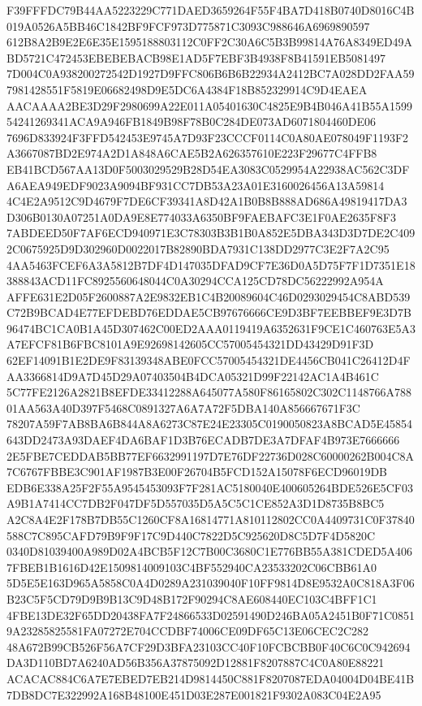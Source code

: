 \documentclass[UTF8,fontset=fandol,zihao=-4,a4paper]{ctexart}
\begin{document}
{{F39FFFDC79B44AA5223229C771DAED3659264F55F4BA7D418B0740D8016C4B019A0526A5BB46C1842BF9FCF973D775871C3093C988646A6969890597
612B8A2B9E2E6E35E1595188803112C0FF2C30A6C5B3B99814A76A8349ED49ABD5721C472453EBEBEBACB98E1AD5F7EBF3B4938F8B41591EB5081497
7D004C0A938200272542D1927D9FFC806B6B6B22934A2412BC7A028DD2FAA597981428551F5819E06682498D9E5DC6A4384F18B852329914C9D4EAEA
AACAAAA2BE3D29F2980699A22E011A05401630C4825E9B4B046A41B55A159954241269341ACA9A946FB1849B98F78B0C284DE073AD6071804460DE06
7696D833924F3FFD542453E9745A7D93F23CCCF0114C0A80AE078049F1193F2A3667087BD2E974A2D1A848A6CAE5B2A626357610E223F29677C4FFB8
EB41BCD567AA13D0F5003029529B28D54EA3083C0529954A22938AC562C3DFA6AEA949EDF9023A9094BF931CC7DB53A23A01E3160026456A13A59814
4C4E2A9512C9D4679F7DE6CF39341A8D42A1B0B8B888AD686A49819417DA3D306B0130A07251A0DA9E8E774033A6350BF9FAEBAFC3E1F0AE2635F8F3
7ABDEED50F7AF6ECD940971E3C78303B3B1B0A852E5DBA343D3D7DE2C4092C0675925D9D302960D0022017B82890BDA7931C138DD2977C3E2F7A2C95
4AA5463FCEF6A3A5812B7DF4D147035DFAD9CF7E36D0A5D75F7F1D7351E18388843ACD11FC8925560648044C0A30294CCA125CD78DC56222992A954A
AFFE631E2D05F2600887A2E9832EB1C4B20089604C46D0293029454C8ABD539C72B9BCAD4E77EFDEBD76EDDAE5CB97676666CE9D3BF7EEBBEF9E3D7B
96474BC1CA0B1A45D307462C00ED2AAA0119419A6352631F9CE1C460763E5A3A7EFCF81B6FBC8101A9E92698142605CC57005454321DD43429D91F3D
62EF14091B1E2DE9F83139348ABE0FCC57005454321DE4456CB041C26412D4FAA3366814D9A7D45D29A07403504B4DCA05321D99F22142AC1A4B461C
5C77FE2126A2821B8EFDE33412288A645077A580F86165802C302C1148766A78801AA563A40D397F5468C0891327A6A7A72F5DBA140A856667671F3C
78207A59F7AB8BA6B844A8A6273C87E24E23305C0190050823A8BCAD5E45854643DD2473A93DAEF4DA6BAF1D3B76ECADB7DE3A7DFAF4B973E7666666
2E5FBE7CEDDAB5BB77EF6632991197D7E76DF22736D028C60000262B004C8A7C6767FBBE3C901AF1987B3E00F26704B5FCD152A15078F6ECD96019DB
EDB6E338A25F2F55A9545453093F7F281AC5180040E400605264BDE526E5CF03A9B1A7414CC7DB2F047DF5D557035D5A5C5C1CE852A3D1D8735B8BC5
A2C8A4E2F178B7DB55C1260CF8A16814771A810112802CC0A4409731C0F37840588C7C895CAFD79B9F9F17C9D440C7822D5C925620D8C5D7F4D5820C
0340D81039400A989D02A4BCB5F12C7B00C3680C1E776BB55A381CDED5A4067FBEB1B1616D42E1509814009103C4BF552940CA23533202C06CBB61A0
5D5E5E163D965A5858C0A4D0289A231039040F10FF9814D8E9532A0C818A3F06B23C5F5CD79D9B9B13C9D48B172F90294C8AE608440EC103C4BFF1C1
4FBE13DE32F65DD20438FA7F24866533D02591490D246BA05A2451B0F71C08519A23285825581FA07272E704CCDBF74006CE09DF65C13E06CEC2C282
48A672B99CB526F56A7CF29D3BFA23103CC40F10FCBCBB0F40C6C0C942694DA3D110BD7A6240AD56B356A37875092D12881F8207887C4C0A80E88221
ACACAC884C6A7E7EBED7EB214D9814450C881F8207087EDA04004D04BE41B7DB8DC7E322992A168B48100E451D03E287E001821F9302A083C04E2A95
}}
\end{document}
